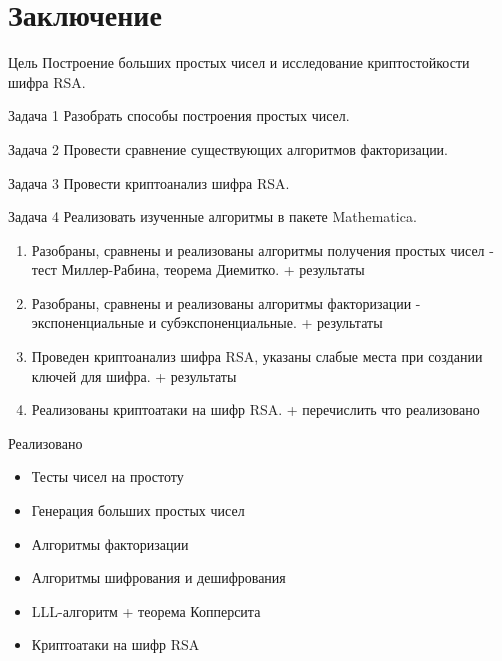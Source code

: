 
\newpage
\chapter*{Заключение}

\begin{block}{Цель}
  Построение больших простых чисел и исследование криптостойкости шифра RSA.  
\end{block}  

\begin{block}{Задача 1}
  Разобрать способы построения простых чисел. 
\end{block} 

\begin{block}{Задача 2}
  Провести сравнение существующих алгоритмов факторизации.
\end{block}

\begin{block}{Задача 3}
  Провести криптоанализ шифра RSA.
\end{block}

\begin{block}{Задача 4}
  Реализовать изученные алгоритмы в пакете Mathematica.
\end{block}

\begin{center}
	\begin{enumerate}
		\item Разобраны, сравнены и реализованы алгоритмы получения простых чисел - тест Миллер-Рабина, теорема Диемитко. + результаты
		\item Разобраны, сравнены и реализованы алгоритмы факторизации - экспоненциальные и субэкспоненциальные. + результаты
		\item Проведен криптоанализ шифра RSA, указаны слабые места при создании ключей для шифра. + результаты
		\item Реализованы криптоатаки на шифр RSA. + перечислить что реализовано
	\end{enumerate}

	\begin{block}{Реализовано}
		\begin{itemize}
	        \item Тесты чисел на простоту
	        \item Генерация больших простых чисел
	        \item Алгоритмы факторизации
	        \item Алгоритмы шифрования и дешифрования
	        \item LLL-алгоритм + теорема Копперсита
	        \item Криптоатаки на шифр RSA
		\end{itemize}
	\end{block}	
\end{center}

